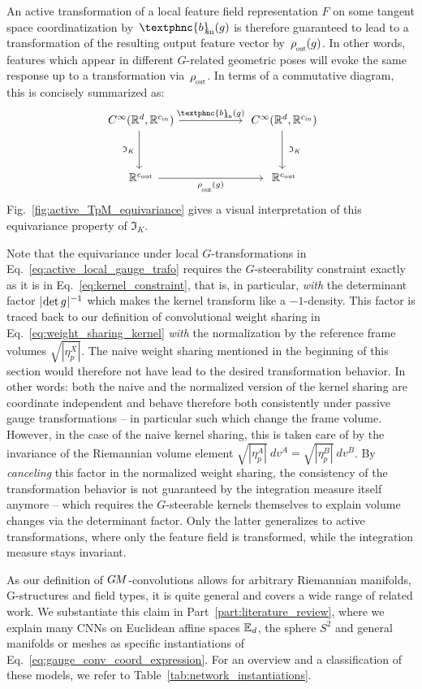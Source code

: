 An active transformation of a local feature field representation $F$ on some tangent space coordinatization by~$\textphnc{b}_{\mkern-5mu\textup{in}}(g)$ is therefore guaranteed to lead to a transformation of the resulting output feature vector by~$\rhoout(g)$.
In other words, features which appear in different $G$-related geometric poses will evoke the same response up to a transformation via~$\rhoout$.
In terms of a commutative diagram, this is concisely summarized as:
\begin{equation}\label{cd:}
\begin{tikzcd}[column sep=56pt, row sep=34pt, font=\normalsize]
    C^\infty(\R^d,\R^{\cin})
        \arrow[d, "\mathfrak{I}_K\,"']
        \arrow[r, "\textphnc{b}_{\mkern-5mu\textup{in}}(g)"]
    &
    C^\infty(\R^d,\R^{\cin})
        \arrow[d, "\ \mathfrak{I}_K"]
    \\
    \R^{\cout}
        \arrow[r, "\rhoout(g)"']
    &
    \R^{\cout}
\end{tikzcd}
\end{equation}
Fig.~\ref{fig:active_TpM_equivariance} gives a visual interpretation of this equivariance property of $\mathfrak{I}_K$.


Note that the equivariance under local $G$-transformations in Eq.~\eqref{eq:active_local_gauge_trafo} requires the $G$-steerability constraint exactly as it is in Eq.~\eqref{eq:kernel_constraint}, that is, in particular, \emph{with} the determinant factor $|\mkern-2mu \det g \mkern1mu|^{-1}$ which makes the kernel transform like a $-1$-density.
This factor is traced back to our definition of convolutional weight sharing in Eq.~\eqref{eq:weight_sharing_kernel} \emph{with} the normalization by the reference frame volumes $\sqrt{|\eta_p^X|}$.
The naive weight sharing mentioned in the beginning of this section would therefore not have lead to the desired transformation behavior.
In other words: both the naive and the normalized version of the kernel sharing are coordinate independent and behave therefore both consistently under passive gauge transformations -- in particular such which change the frame volume.
However, in the case of the naive kernel sharing, this is taken care of by the invariance of the Riemannian volume element $\sqrt{|\eta_p^A|}\ dv^A = \sqrt{|\eta_p^B|}\ dv^B$.
By \emph{canceling} this factor in the normalized weight sharing, the consistency of the transformation behavior is not guaranteed by the integration measure itself anymore -- which requires the $G$-steerable kernels themselves to explain volume changes via the determinant factor.
Only the latter generalizes to active transformations, where only the feature field is transformed, while the integration measure stays invariant.


As our definition of $G\mkern-1.4muM$-convolutions allows for arbitrary Riemannian manifolds, G-structures and field types, it is quite general and covers a wide range of related work.
We substantiate this claim in Part~\ref{part:literature_review}, where we explain many CNNs on Euclidean affine spaces $\mathbb{E}_d$, the sphere $S^2$ and general manifolds or meshes as specific instantiations of Eq.~\eqref{eq:gauge_conv_coord_expression}.
For an overview and a classification of these models, we refer to Table~\ref{tab:network_instantiations}.
